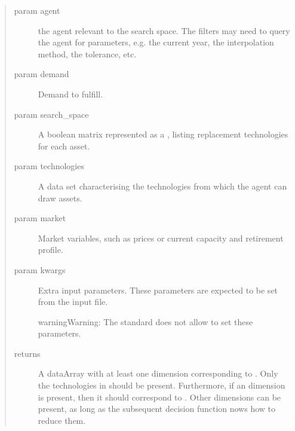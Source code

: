 \documentclass[letterpaper,10pt,english]{sphinxmanual}
\begin{document}
\begin{sphinxVerbatim}[commandchars=\\\{\}]
 
     
     
     
     
     
  
\end{sphinxVerbatim}
\begin{quote}\begin{description}
\item[{param agent}] \leavevmode
the agent relevant to the search space. The filters may need to query
the agent for parameters, e.g. the current year, the interpolation
method, the tolerance, etc.

\item[{param demand}] \leavevmode
Demand to fulfill.

\item[{param search\_space}] \leavevmode
A boolean matrix represented as a , listing
replacement technologies for each asset.

\item[{param technologies}] \leavevmode
A data set characterising the technologies from which the
agent can draw assets.

\item[{param market}] \leavevmode
Market variables, such as prices or current capacity and retirement
profile.

\item[{param kwargs}] \leavevmode
Extra input parameters. These parameters are expected to be set from the
input file.

\begin{sphinxadmonition}{warning}{Warning:}
The standard {\hyperref[\detokenize{inputs/agents:inputs-agents}]{}} does not allow to set
these parameters.
\end{sphinxadmonition}

\item[{returns}] \leavevmode
A dataArray with at least one dimension corresponding to .  Only the
technologies in  should be present.  Furthermore, if an
 dimension is present, then it should correspond to .
Other dimensions can be present, as long as the subsequent decision function nows
how to reduce them.

\end{description}\end{quote}
\end{document}

